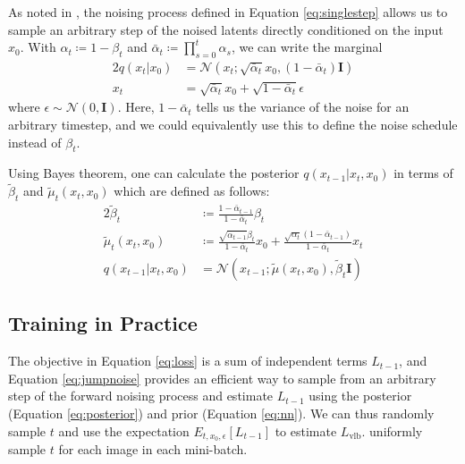 \documentclass{article}
\begin{document}
As noted in \cite{ddpm}, the noising process defined in Equation \ref{eq:singlestep} allows us to sample an arbitrary step of the noised latents directly conditioned on the input $x_0$. With $\alpha_t \coloneqq 1 - \beta_t$ and $\bar{\alpha}_t \coloneqq \prod_{s=0}^{t} \alpha_s$, we can write the marginal
\begin{alignat}{2}
    q(x_t|x_0) &= \mathcal{N}(x_t; \sqrt{\bar{\alpha}_t} x_0, (1-\bar{\alpha}_t) \mathbf{I}) \label{eq:marginal} \\
    x_t &=  \sqrt{\bar{\alpha}_t} x_0 + \sqrt{1-\bar{\alpha}_t} \epsilon \label{eq:jumpnoise}
\end{alignat}
where $\epsilon \sim \mathcal{N}(0,\mathbf{I})$. Here, $1 - \bar{\alpha}_t$ tells us the variance of the noise for an arbitrary timestep, and we could equivalently use this to define the noise schedule instead of $\beta_t$.

Using Bayes theorem, one can calculate the posterior $q(x_{t-1}|x_t,x_0)$ in terms of $\tilde{\beta}_t$ and $\tilde{\mu}_t(x_t,x_0)$ which are defined as follows:
\begin{alignat}{2}
    \tilde{\beta}_t &\coloneqq \frac{1-\bar{\alpha}_{t-1}}{1-\bar{\alpha}_t} \beta_t \label{eq:betatilde} \\
    \tilde{\mu}_t(x_t,x_0) &\coloneqq \frac{\sqrt{\bar{\alpha}_{t-1}}\beta_t}{1-\bar{\alpha}_t}x_0 + \frac{\sqrt{\alpha_t}(1-\bar{\alpha}_{t-1})}{1-\bar{\alpha}_t} x_t \label{eq:mutilde} \\
    q(x_{t-1}|x_t,x_0) &= \mathcal{N}(x_{t-1}; \tilde{\mu}(x_t, x_0), \tilde{\beta}_t \mathbf{I}) \label{eq:posterior}
\end{alignat}

\subsection{Training in Practice}

The objective in Equation \ref{eq:loss} is a sum of independent terms $L_{t-1}$, and Equation \ref{eq:jumpnoise} provides an efficient way to sample from an arbitrary step of the forward noising process and estimate $L_{t-1}$ using the posterior (Equation \ref{eq:posterior}) and prior (Equation \ref{eq:nn}). We can thus randomly sample $t$ and use the expectation $E_{t,x_0,\epsilon}[L_{t-1}]$ to estimate $L_{\text{vlb}}$. \citet{ddpm} uniformly sample $t$ for each image in each mini-batch.
\end{document}
